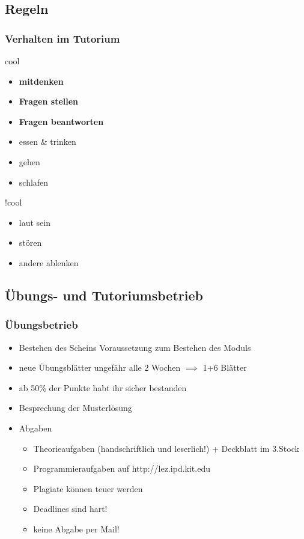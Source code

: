 \documentclass[18pt]{beamer}
\begin{document}
	\subsection{Regeln}
		\begin{frame}
			\frametitle{Verhalten im Tutorium}
			\begin{block}{cool}
				\begin{itemize}
					\item \textbf{mitdenken}
					\item \textbf{Fragen stellen}
					\item \textbf{Fragen beantworten}
					\item essen \& trinken
					\item gehen
					\item schlafen
				\end{itemize}
			\end{block}
			\pause
			\begin{block}{!cool}
				\begin{itemize}
					\item laut sein
					\item stören
					\item andere ablenken
				\end{itemize}
			\end{block}
		\end{frame}
		
	\subsection{Übungs- und Tutoriumsbetrieb}
		\begin{frame}
			\frametitle{Übungsbetrieb}
			\begin{itemize}
				\item Bestehen des Scheins Voraussetzung zum Bestehen des Moduls
				\item neue Übungsblätter ungefähr alle 2 Wochen $\implies$ 1+6 Blätter
				\item ab 50\% der Punkte habt ihr sicher bestanden
				\item Besprechung der Musterlösung
				\pause
				\item Abgaben
					\begin{itemize}
						\item Theorieaufgaben (handschriftlich und leserlich!) + Deckblatt im 3.Stock
						\item Programmieraufgaben auf http://lez.ipd.kit.edu 
						\item Plagiate können teuer werden
						\item Deadlines sind hart!
						\item keine Abgabe per Mail!
					\end{itemize}
			\end{itemize}
		\end{frame}
		
\end{document}
